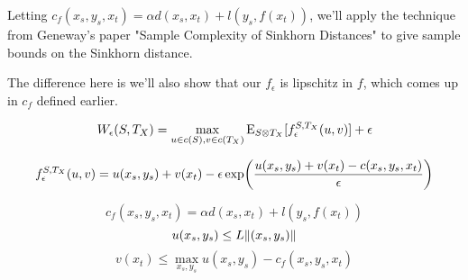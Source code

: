 %
%
%

Letting $c_f(x_s,y_s,x_t) = \alpha d(x_s,x_t) + l(y_s,f(x_t))$, we'll apply the technique from Geneway's paper "Sample Complexity of Sinkhorn Distances" to give sample bounds on the Sinkhorn distance.

The difference here is we'll also show that our $f_{\epsilon}$ is lipschitz in $f$, which comes up in $c_f$ defined earlier.

$$W_{\epsilon}(S,T_X) = \max_{u\in c(S),v\in c(T_X)} \mathrm{E}_{S\otimes T_X} [f_{\epsilon}^{S,T_X}(u,v)]+\epsilon$$

$$f_{\epsilon}^{S,T_X}(u,v) = u(x_s,y_s)+v(x_t)-\epsilon \exp \paren*{\frac{u(x_s,y_s)+v(x_t)-c(x_s,y_s,x_t)}{\epsilon}}$$

$$c_f(x_s,y_s,x_t) = \alpha d(x_s,x_t)+l(y_s,f(x_t))$$
$$u(x_s,y_s)\leq L\lVert(x_s,y_s)\rVert$$
$$v(x_t) \leq \max_{x_s,y_s} u(x_s,y_s)-c_f(x_s,y_s,x_t)$$



